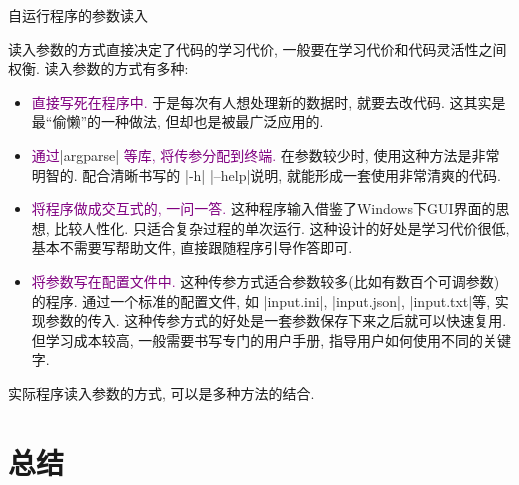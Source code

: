 \documentclass{beamer}
\newcommand{\purple}{\textcolor{purple}}
\begin{document}
    \begin{frame}[fragile]{自运行程序的参数读入}
      \begin{block}{}\footnotesize
        读入参数的方式直接决定了代码的学习代价, 一般要在学习代价和代码灵活性之间权衡. 读入参数的方式有多种:
        \begin{itemize}\footnotesize
          \item \purple{直接写死在程序中.} 于是每次有人想处理新的数据时, 就要去改代码. 这其实是最``偷懒''的一种做法, 但却也是被最广泛应用的.
          \item \purple{通过}\cverb|argparse| \purple{等库, 将传参分配到终端.} 在参数较少时, 使用这种方法是非常明智的. 配合清晰书写的 \cverb|-h| \cverb|--help|说明, 就能形成一套使用非常清爽的代码.
          \item \purple{将程序做成交互式的, 一问一答.} 这种程序输入借鉴了Windows下GUI界面的思想, 比较人性化. 只适合复杂过程的单次运行. 这种设计的好处是学习代价很低, 基本不需要写帮助文件, 直接跟随程序引导作答即可.
          \item \purple{将参数写在配置文件中.} 这种传参方式适合参数较多(比如有数百个可调参数)的程序. 通过一个标准的配置文件, 如 \cverb|input.ini|, \cverb|input.json|, \cverb|input.txt|等, 实现参数的传入. 这种传参方式的好处是一套参数保存下来之后就可以快速复用. 但学习成本较高, 一般需要书写专门的用户手册, 指导用户如何使用不同的关键字.
        \end{itemize}
      \end{block}
      \small 实际程序读入参数的方式, 可以是多种方法的结合.
    \end{frame}

    \section{总结}
\end{document}
